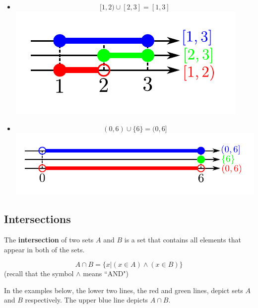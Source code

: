 \documentclass{article}
\begin{document}
\begin{itemize}
\item 
\[[1, 2) \cup [2, 3] = [1, 3]\]
\includegraphics[scale = 0.9]{union_example_5}
\item 
\[(0, 6) \cup \{6\} = (0, 6]\]
\includegraphics[scale = 0.9]{union_example_6}
\end{itemize}


\subsection*{Intersections}

The {\bf intersection} of two sets \(A\) and \(B\) is a set that contains all elements that appear in both of the sets.

\[A \cap B = \{x | (x \in A) \wedge (x \in B)\}\]
(recall that the symbol \(\wedge\) means ``AND")

In the examples below, the lower two lines, the red and green lines, depict sets \(A\) and \(B\) respectively. The upper blue line depicts \(A \cap B\).
\end{document}
